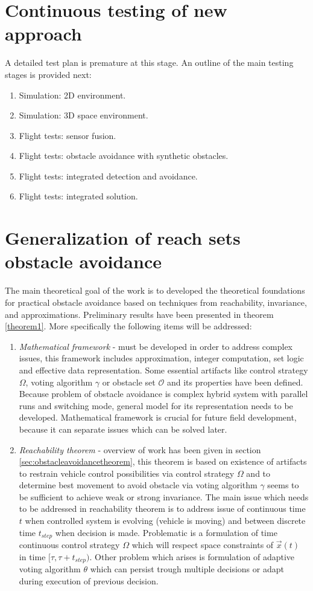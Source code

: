 \section{Continuous testing of new approach}
A detailed test plan is premature at this stage. An outline of the main testing stages is provided next:
\begin{enumerate}
    \item Simulation: 2D environment.
    \item Simulation: 3D space environment.
    \item Flight tests: sensor fusion.
    \item Flight tests: obstacle avoidance with synthetic obstacles.
    \item Flight tests: integrated detection and avoidance.
    \item Flight tests: integrated solution.
\end{enumerate}

\section{Generalization of reach sets obstacle avoidance}
The main theoretical goal of the work is to developed the theoretical foundations for practical obstacle avoidance based on techniques from reachability, invariance, and approximations. Preliminary results have been presented in theorem \ref{theorem1}. More specifically the following items will be addressed:
\begin{enumerate}
    \item \textit{Mathematical framework} - must be developed in order to address complex issues, this framework includes approximation, integer computation, set logic and effective data representation. Some essential artifacts like control strategy $\Omega$, voting algorithm $\gamma$ or obstacle set $\mathscr{O}$ and its properties have been defined. Because problem of obstacle avoidance is complex hybrid system with parallel runs and switching mode, general model for its representation needs to be developed. Mathematical framework is crucial for future field development, because it can separate issues which can be solved later. 
    \item \textit{Reachability theorem}  - overview of work has been given in section \ref{sec:obstacleavoidancetheorem}, this theorem is based on existence of artifacts to restrain vehicle control possibilities via control strategy $\Omega$ and to determine best movement to avoid obstacle via voting algorithm $\gamma$ seems to be sufficient to achieve weak or strong invariance. The main issue which needs to be addressed in reachability theorem is to address issue of continuous time $t$ when controlled system is evolving (vehicle is moving) and between discrete time $t_{step}$ when decision is made. Problematic is a formulation of time continuous control strategy $\Omega$ which will respect space constraints of $\vec{x}(t)$ in time $[\tau, \tau + t_{step})$. Other problem which arises is formulation of adaptive voting algorithm $\theta$ which can persist trough multiple decisions or adapt during execution of previous decision.
\end{enumerate}

